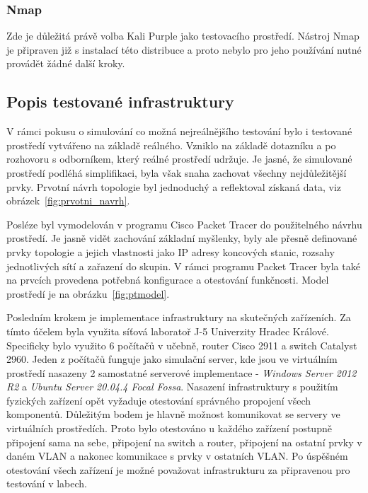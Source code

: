 \subsubsection{Nmap}
Zde je důležitá právě volba Kali Purple jako testovacího prostředí.
Nástroj Nmap je připraven již s instalací této distribuce a proto nebylo pro jeho používání nutné provádět žádné další kroky.


\subsection{Popis testované infrastruktury}\label{subsec:popis-testovane-infrastruktury}
V rámci pokusu o simulování co možná nejreálnějšího testování bylo i testované prostředí vytvářeno na základě reálného.
Vzniklo na základě dotazníku a po rozhovoru s odborníkem, který reálné prostředí udržuje.
Je jasné, že simulované prostředí podléhá simplifikaci, byla však snaha zachovat všechny nejdůležitější prvky.
Prvotní návrh topologie byl jednoduchý a reflektoval získaná data, viz obrázek~\ref{fig:prvotni_navrh}.


Posléze byl vymodelován v programu Cisco Packet Tracer do použitelného návrhu prostředí.
Je jasně vidět zachování základní myšlenky, byly ale přesně definované prvky topologie a jejich vlastnosti jako IP adresy koncových stanic, rozsahy jednotlivých sítí a zařazení do  skupin.
V rámci programu Packet Tracer byla také na prvcích provedena potřebná konfigurace a otestování funkčnosti.
Model prostředí je na obrázku~\ref{fig:ptmodel}.



Posledním krokem je implementace infrastruktury na skutečných zařízeních.
Za tímto účelem byla využita síťová laboratoř J-5 Univerzity Hradec Králové.
Specificky bylo využito 6 počítačů v učebně, router Cisco 2911 a switch Catalyst 2960.
Jeden z počítačů funguje jako simulační server, kde jsou ve virtuálním prostředí nasazeny 2 samostatné serverové implementace - \textit{Windows Server 2012 R2} a \textit{Ubuntu Server 20.04.4 Focal Fossa}.
Nasazení infrastruktury s použitím fyzických zařízení opět vyžaduje otestování správného propojení všech komponentů.
Důležitým bodem je hlavně možnost komunikovat se servery ve virtuálních prostředích.
Proto bylo otestováno u každého zařízení postupně připojení sama na sebe, připojení na switch a router, připojení na ostatní prvky v daném \ac{VLAN} a nakonec komunikace s prvky v ostatních \ac{VLAN}.
Po úspěšném otestování všech zařízení je možné považovat infrastrukturu za připravenou pro testování v labech.


